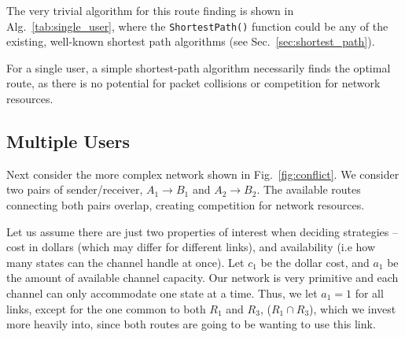\documentclass[aps,rmp,twocolumn,amsmath,amssymb,nofootinbib,superscriptaddress]{revtex4}
\begin{document}
The very trivial algorithm for this route finding is shown in Alg.~\ref{tab:single_user}, where the {\tt ShortestPath()} function could be any of the existing, well-known shortest path algorithms (see Sec.~\ref{sec:shortest_path}).
\begin{table}[!htb]
\caption{For a single user, a simple shortest-path algorithm necessarily finds the optimal route, as there is no potential for packet collisions or competition for network resources.} \label{tab:single_user}
\end{table}

%
%

\subsection{Multiple Users} \label{sec:two_user}

Next consider the more complex network shown in Fig.~\ref{fig:conflict}. We consider two pairs of sender/receiver, \mbox{$A_1\to B_1$} and \mbox{$A_2\to B_2$}. The available routes connecting both pairs overlap, creating competition for network resources.

Let us assume there are just two properties of interest when deciding strategies -- cost in dollars (which may differ for different links), and availability (i.e how many states can the channel handle at once). Let $c_1$ be the dollar cost, and \mbox{$a_1$} be the amount of available channel capacity. Our network is very primitive and each channel can only accommodate one state at a time. Thus, we let \mbox{$a_1=1$} for all links, except for the one common to both $R_1$ and $R_3$, \mbox{($R_1\cap R_3$)}, which we invest more heavily into, since both routes are going to be wanting to use this link.
\end{document}
